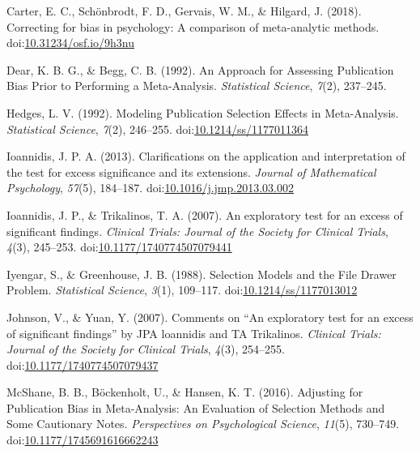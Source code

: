 \documentclass[man,floatsintext]{apa6}
\begin{document}
\leavevmode\hypertarget{ref-carter2018CorrectingBiasPsychology}{}%
Carter, E. C., Schönbrodt, F. D., Gervais, W. M., \& Hilgard, J. (2018). Correcting for bias in psychology: A comparison of meta-analytic methods. doi:\href{https://doi.org/10.31234/osf.io/9h3nu}{10.31234/osf.io/9h3nu}

\leavevmode\hypertarget{ref-dear1992ApproachAssessingPublication}{}%
Dear, K. B. G., \& Begg, C. B. (1992). An Approach for Assessing Publication Bias Prior to Performing a Meta-Analysis. \emph{Statistical Science}, \emph{7}(2), 237--245.

\leavevmode\hypertarget{ref-hedges1992ModelingPublicationSelection}{}%
Hedges, L. V. (1992). Modeling Publication Selection Effects in Meta-Analysis. \emph{Statistical Science}, \emph{7}(2), 246--255. doi:\href{https://doi.org/10.1214/ss/1177011364}{10.1214/ss/1177011364}

\leavevmode\hypertarget{ref-ioannidis2013ClarificationsApplicationInterpretation}{}%
Ioannidis, J. P. A. (2013). Clarifications on the application and interpretation of the test for excess significance and its extensions. \emph{Journal of Mathematical Psychology}, \emph{57}(5), 184--187. doi:\href{https://doi.org/10.1016/j.jmp.2013.03.002}{10.1016/j.jmp.2013.03.002}

\leavevmode\hypertarget{ref-ioannidis2007ExploratoryTestExcess}{}%
Ioannidis, J. P., \& Trikalinos, T. A. (2007). An exploratory test for an excess of significant findings. \emph{Clinical Trials: Journal of the Society for Clinical Trials}, \emph{4}(3), 245--253. doi:\href{https://doi.org/10.1177/1740774507079441}{10.1177/1740774507079441}

\leavevmode\hypertarget{ref-iyengar1988SelectionModelsFile}{}%
Iyengar, S., \& Greenhouse, J. B. (1988). Selection Models and the File Drawer Problem. \emph{Statistical Science}, \emph{3}(1), 109--117. doi:\href{https://doi.org/10.1214/ss/1177013012}{10.1214/ss/1177013012}

\leavevmode\hypertarget{ref-johnson2007CommentsExploratoryTest}{}%
Johnson, V., \& Yuan, Y. (2007). Comments on ``An exploratory test for an excess of significant findings'' by JPA loannidis and TA Trikalinos. \emph{Clinical Trials: Journal of the Society for Clinical Trials}, \emph{4}(3), 254--255. doi:\href{https://doi.org/10.1177/1740774507079437}{10.1177/1740774507079437}

\leavevmode\hypertarget{ref-mcshane2016AdjustingPublicationBias}{}%
McShane, B. B., Böckenholt, U., \& Hansen, K. T. (2016). Adjusting for Publication Bias in Meta-Analysis: An Evaluation of Selection Methods and Some Cautionary Notes. \emph{Perspectives on Psychological Science}, \emph{11}(5), 730--749. doi:\href{https://doi.org/10.1177/1745691616662243}{10.1177/1745691616662243}
\end{document}
